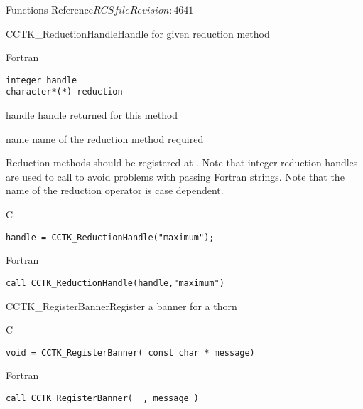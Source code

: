 \begin{cactuspart}{ Functions Reference}{$RCSfile$}{$Revision: 4641 $}
\begin{FunctionDescription}{CCTK\_ReductionHandle}{Handle for given reduction method}
\begin{SynopsisSection}
\begin{Synopsis}{Fortran}
\begin{verbatim}
integer handle
character*(*) reduction\end{verbatim}
\end{Synopsis}
\end{SynopsisSection}
\begin{ParameterSection}
\begin{Parameter}{handle}
handle returned for this method
\end{Parameter}
\begin{Parameter}{name}
name of the reduction method required
\end{Parameter}
\end{ParameterSection}
\begin{Discussion}
Reduction methods should be registered at . Note that
integer reduction handles are used to call  to avoid
problems with passing Fortran strings. Note that the name of the reduction
operator is case dependent.
\end{Discussion}
\begin{ExampleSection}
\begin{Example}{C}
\begin{verbatim}
handle = CCTK_ReductionHandle("maximum");
\end{verbatim}
\end{Example}
\begin{Example}{Fortran}
\begin{verbatim}
call CCTK_ReductionHandle(handle,"maximum")
\end{verbatim}
\end{Example}
\end{ExampleSection}
\end{FunctionDescription}

\begin{FunctionDescription}{CCTK\_RegisterBanner}{Register a banner for a thorn}
\label{CCTK-RegisterBanner}
\begin{SynopsisSection}
\begin{Synopsis}{C}
\begin{verbatim}void = CCTK_RegisterBanner( const char * message)\end{verbatim}
\end{Synopsis}
\begin{Synopsis}{Fortran}
\begin{verbatim}call CCTK_RegisterBanner(  , message )


\end{verbatim}
\end{Synopsis}
\end{SynopsisSection}
\end{FunctionDescription}
\end{cactuspart}
